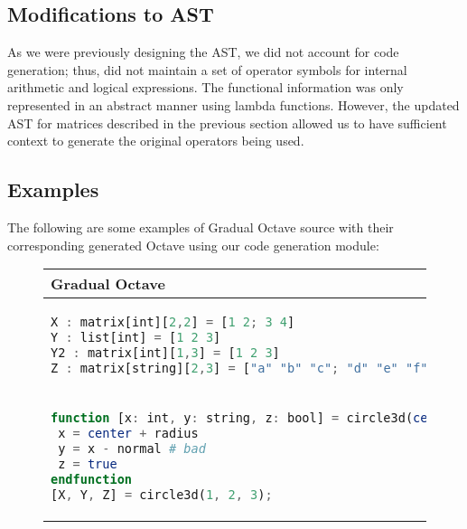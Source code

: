 \subsection{Modifications to AST}
As we were previously designing the AST, we did not account for code generation; thus, did not maintain a set of operator symbols for internal arithmetic and logical expressions. The functional information was only represented in an abstract manner using lambda functions. However, the updated AST for matrices described in the previous section allowed us to have sufficient context to generate the original operators being used.

\subsection{Examples}
The following are some examples of Gradual Octave source with their corresponding generated Octave using our code generation module:

\lstset{
  basicstyle=\ttfamily,
  columns=fullflexible,
  breaklines=true,
}

\begin{figure}[h]
\begin{tabular}{|p{4cm}|p{4cm}|p{4cm}|}
\hline
Gradual Octave  &  Generated Octave \\
\hline
\begin{lstlisting}[language=octave,numbers=none]
X : matrix[int][2,2] = [1 2; 3 4]
Y : list[int] = [1 2 3]
Y2 : matrix[int][1,3] = [1 2 3]
Z : matrix[string][2,3] = ["a" "b" "c"; "d" "e" "f"]
\end{lstlisting}&
\begin{lstlisting}[language=octave,numbers=none]
X = [1 2; 3 4]
Y = [1 2 3]
Y2 = [1 2 3]
Z = ["a" "b" "c"; "d" "e" "f"]
\end{lstlisting} \\
\hline
\begin{lstlisting}[language=octave,numbers=none]
function [x: int, y: string, z: bool] = circle3d(center: int, normal: int, radius: int)
 x = center + radius
 y = x - normal # bad
 z = true
endfunction
[X, Y, Z] = circle3d(1, 2, 3);
\end{lstlisting}&
\begin{lstlisting}[language=octave,numbers=none]
function [x, y, z] = circle3d(center, normal, radius)
    x = center+radius
    y = x-normal
    z = true
endfunction
[X, Y, Z] = circle3d(1, 2, 3)
\end{lstlisting} \\
\hline
\end{tabular}
\end{figure}

